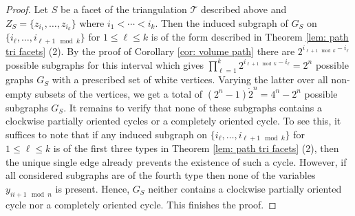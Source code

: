 \begin{proof}
Let $S$ be a facet of the triangulation $\mathcal{T}$ described above and $Z_S = \{z_{i_1},\ldots, z_{i_k}\}$ where $i_1<\cdots < i_k$. 
Then the induced subgraph of $G_S$ on $\{i_\ell,\ldots,i_{\ell+1 \mod k}\}$ for $1\leq \ell\leq k$ is of the form described in Theorem \ref{lem: path tri facets} (2). By the proof of Corollary \ref{cor: volume path} there are $2^{i_{\ell+1\mod k}-i_\ell}$ possible subgraphs for this interval which gives $\prod_{\ell=1}^k 2^{i_{\ell+1\mod k}-i_\ell}=2^n$ possible graphs $G_S$ with a prescribed set of white vertices. Varying the latter over all non-empty subsets of the vertices, we get a total of $(2^n-1)\dot 2^n=4^n-2^n$ possible subgraphs $G_S$. It remains to verify that none of these subgraphs contains a clockwise partially oriented cycles or a completely oriented cycle. 
To see this, it suffices to note that if any induced subgraph on $\{i_\ell,\ldots,i_{\ell+1 \mod k}\}$ for  $1\leq \ell\leq k$ is of the first three types in Theorem \ref{lem: path tri facets} (2), then the unique single edge already prevents the existence of such a cycle. 
However, if all considered subgraphs are of the fourth type then none of the variables $y_{ii+1\mod n}$ is present. 
Hence, $G_S$ neither contains a clockwise partially oriented cycle nor a completely oriented cycle. This finishes the proof.
\end{proof}

